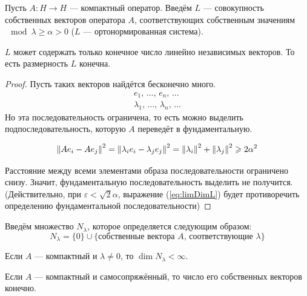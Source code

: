 \documentclass[12pt]{article}
\begin{document}
			Пусть $A: H \rightarrow H$ --- компактный оператор. Введём $L$ --- совокупность собственных векторов 
			оператора $A$, соответствующих собственным значениям $\mod{\lambda} \geq \alpha > 0$ 
			($L$ --- ортонормированная система).
			\begin{state} \label{st:limLambda}	
				$L$ может содержать только конечное число {\color{gray}линейно независимых} векторов.		
				{\color{gray} То есть размерность $L$ конечна.}
			\end{state}
			\begin{proof}
				Пусть таких векторов найдётся бесконечно много.
				\begin{gather*}
				 	e_1      ,\, \dots,\, e_n      ,\, \dots \\
					\lambda_1,\, \dots,\, \lambda_n,\, \dots
				\end{gather*}
				Но эта последовательность ограничена, то есть можно выделить подпоследовательность, которую $A$ переведёт в фундаментальную.
		
				\begin{equation} \label{eq:limDimL}
					\left\| Ae_i - Ae_j \right\|^2 = \left\| \lambda_ie_i - \lambda_je_j \right\|^2 = \left\| \lambda_i \right\|^2 + \left\| \lambda_j \right\|^2 \geqslant 2\alpha^2
				\end{equation}
		
				Расстояние между всеми элементами образа последовательности ограничено снизу. Значит, фундаментальную последовательность
				выделить не получится. \color{gray}(Действительно, при $\varepsilon < \sqrt{2}\alpha$, выражение (\ref{eq:limDimL}) будет 
				противоречить определению фундаментальной последовательности)
			\end{proof}
	
			Введём множество $N_{\lambda}$, которое определяется следующим образом:
			$$N_{\lambda} = \{0\} \cup \{\text{собственные вектора $A$, соответствующие $\lambda$}\}$$
	
			\begin{note}
				Если $A$ --- компактный и $\lambda \neq 0$, то $\dim N_{\lambda} < \infty$.
			\end{note}
			\begin{note}
				Если $A$ --- компактный и самосопряжённый, то число его собственных векторов конечно.
			\end{note}
	
\end{document}
